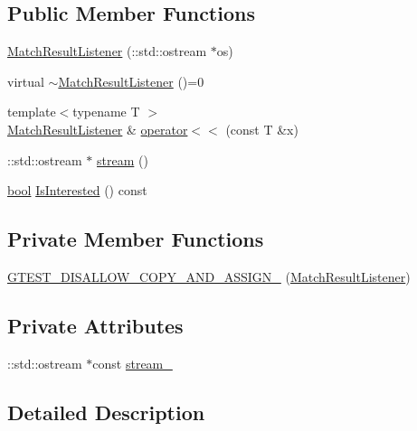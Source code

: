 \subsection*{Public Member Functions}
\begin{DoxyCompactItemize}
\item 
\hyperlink{classtesting_1_1MatchResultListener_a245c360286cd0496d22a4d2fde80eb0b}{Match\+Result\+Listener} (\+::std\+::ostream $\ast$os)
\item 
virtual \hyperlink{classtesting_1_1MatchResultListener_aa29f43f7b2ffd850c721a8a33ccbba92}{$\sim$\+Match\+Result\+Listener} ()=0
\item 
{\footnotesize template$<$typename T $>$ }\\\hyperlink{classtesting_1_1MatchResultListener}{Match\+Result\+Listener} \& \hyperlink{classtesting_1_1MatchResultListener_a89f628a452635d1502a9062d9c864ebd}{operator$<$$<$} (const T \&x)
\item 
\+::std\+::ostream $\ast$ \hyperlink{classtesting_1_1MatchResultListener_a5abecb247e005f7f50a94898e3f44ee3}{stream} ()
\item 
\hyperlink{classbool}{bool} \hyperlink{classtesting_1_1MatchResultListener_ac34f9771f2ba6128cd6a1348b3aebda3}{Is\+Interested} () const
\end{DoxyCompactItemize}
\subsection*{Private Member Functions}
\begin{DoxyCompactItemize}
\item 
\hyperlink{classtesting_1_1MatchResultListener_ad41af985b372f2d8394e01fd52a1e53d}{G\+T\+E\+S\+T\+\_\+\+D\+I\+S\+A\+L\+L\+O\+W\+\_\+\+C\+O\+P\+Y\+\_\+\+A\+N\+D\+\_\+\+A\+S\+S\+I\+G\+N\+\_\+} (\hyperlink{classtesting_1_1MatchResultListener}{Match\+Result\+Listener})
\end{DoxyCompactItemize}
\subsection*{Private Attributes}
\begin{DoxyCompactItemize}
\item 
\+::std\+::ostream $\ast$const \hyperlink{classtesting_1_1MatchResultListener_a91ff831a7e848af58d44eb3b1801812c}{stream\+\_\+}
\end{DoxyCompactItemize}


\subsection{Detailed Description}



